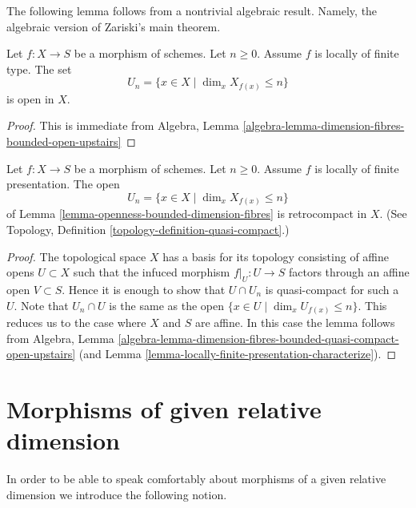 \noindent
The following lemma follows from a nontrivial algebraic result.
Namely, the algebraic version of Zariski's main theorem.

\begin{lemma}
\label{lemma-openness-bounded-dimension-fibres}
Let $f : X \to S$ be a morphism of schemes.
Let $n \geq 0$. Assume $f$ is locally of finite type.
The set
$$
U_n = \{x \in X \mid \dim_x X_{f(x)} \leq n\}
$$
is open in $X$.
\end{lemma}

\begin{proof}
This is immediate from
Algebra,
Lemma \ref{algebra-lemma-dimension-fibres-bounded-open-upstairs}
\end{proof}

\begin{lemma}
\label{lemma-openness-bounded-dimension-fibres-finite-presentation}
Let $f : X \to S$ be a morphism of schemes.
Let $n \geq 0$. Assume $f$ is locally of finite presentation.
The open
$$
U_n = \{x \in X \mid \dim_x X_{f(x)} \leq n\}
$$
of Lemma \ref{lemma-openness-bounded-dimension-fibres} is retrocompact
in $X$. (See Topology, Definition \ref{topology-definition-quasi-compact}.)
\end{lemma}

\begin{proof}
The topological space $X$ has a basis for its topology consisting of
affine opens $U \subset X$ such that the infuced morphism
$f|_U : U \to S$ factors through an affine open $V \subset S$. Hence
it is enough to show that $U \cap U_n$ is quasi-compact for such a $U$.
Note that $U_n \cap U$ is the same as the open
$\{x \in U \mid \dim_x U_{f(x)} \leq n\}$. This reduces us to the case
where $X$ and $S$ are affine. In this case the lemma follows from
Algebra,
Lemma \ref{algebra-lemma-dimension-fibres-bounded-quasi-compact-open-upstairs}
(and Lemma \ref{lemma-locally-finite-presentation-characterize}).
\end{proof}





\section{Morphisms of given relative dimension}
\label{section-relative-dimension}

\noindent
In order to be able to speak comfortably about morphisms of a
given relative dimension we introduce the following notion.

